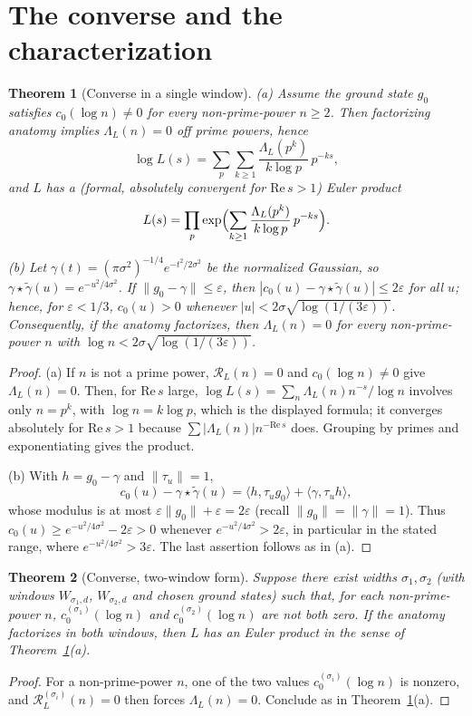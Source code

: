 \documentclass[11pt]{amsart}
\newtheorem{theorem}{Theorem}[section]
\theoremstyle{definition}
\theoremstyle{remark}
\newcommand{\cR}{\mathcal R}
\begin{document}
\section{The converse and the characterization}\label{sec:conv}
\begin{theorem}[Converse in a single window]\label{thm:convdet}
\textup{(a)} Assume the ground state $g_0$ satisfies $c_0(\log n)\neq0$
for every non-prime-power $n\ge2$. Then factorizing anatomy implies
$\Lambda_L(n)=0$ off prime powers, hence
\[
\log L(s)=\sum_p\sum_{k\ge1}\frac{\Lambda_L(p^k)}{k\log p}\,p^{-ks},
\]
and $L$ has a (formal, absolutely convergent for $\mathrm{Re}\,s>1$) Euler product
\[
L(s)=\prod_p\exp\Bigl(\sum_{k\ge1}\frac{\Lambda_L(p^k)}{k\log p}\,p^{-ks}\Bigr).
\]

\textup{(b)} Let $\gamma(t)=(\pi\sigma^2)^{-1/4}e^{-t^2/2\sigma^2}$ be the
normalized Gaussian, so $\gamma\star\tilde\gamma(u)=e^{-u^2/4\sigma^2}$. If
$\|g_0-\gamma\|\le\varepsilon$, then
$|c_0(u)-\gamma\star\tilde\gamma(u)|\le2\varepsilon$ for all $u$;
hence, for $\varepsilon<1/3$, $c_0(u)>0$ whenever
$|u|<2\sigma\sqrt{\log(1/(3\varepsilon))}$. Consequently, if the anatomy
factorizes, then $\Lambda_L(n)=0$ for every non-prime-power $n$ with
$\log n<2\sigma\sqrt{\log(1/(3\varepsilon))}$.
\end{theorem}
\begin{proof}
(a) If $n$ is not a prime power, $\cR_L(n)=0$ and $c_0(\log n)\ne0$
give $\Lambda_L(n)=0$. Then, for $\mathrm{Re}\,s$ large, $\log L(s)=\sum_n
\Lambda_L(n)n^{-s}/\log n$ involves only $n=p^k$, with $\log n=k\log p$, which is
the displayed formula; it converges absolutely for $\mathrm{Re}\,s>1$ because
$\sum|\Lambda_L(n)|n^{-\mathrm{Re}\,s}$ does. Grouping by primes and
exponentiating gives the product.

(b) With $h=g_0-\gamma$ and $\|\tau_u\|=1$,
\[
c_0(u)-\gamma\star\tilde\gamma(u)=\langle h,\tau_ug_0\rangle+\langle\gamma,\tau_uh\rangle,
\]
whose modulus is at most $\varepsilon\|g_0\|+\varepsilon=2\varepsilon$
(recall $\|g_0\|=\|\gamma\|=1$). Thus $c_0(u)\ge e^{-u^2/4\sigma^2}-2\varepsilon>0$ whenever
$e^{-u^2/4\sigma^2}>2\varepsilon$, in particular in the stated range, where
$e^{-u^2/4\sigma^2}>3\varepsilon$. The last assertion follows as in (a).
\end{proof}

\begin{theorem}[Converse, two-window form]\label{thm:conv2}
Suppose there exist widths $\sigma_1,\sigma_2$ (with windows $W_{\sigma_1,d}$,
$W_{\sigma_2,d}$ and chosen ground states) such that, for each non-prime-power
$n$, $c_0^{(\sigma_1)}(\log n)$ and $c_0^{(\sigma_2)}(\log n)$
are not both zero. If the anatomy factorizes in both windows, then $L$ has an
Euler product in the sense of Theorem~\ref{thm:convdet}\textup{(a)}.
\end{theorem}
\begin{proof}
For a non-prime-power $n$, one of the two values
$c_0^{(\sigma_i)}(\log n)$ is nonzero, and $\cR_L^{(\sigma_i)}(n)=0$
then forces $\Lambda_L(n)=0$. Conclude as in Theorem~\ref{thm:convdet}(a).
\end{proof}
\end{document}
